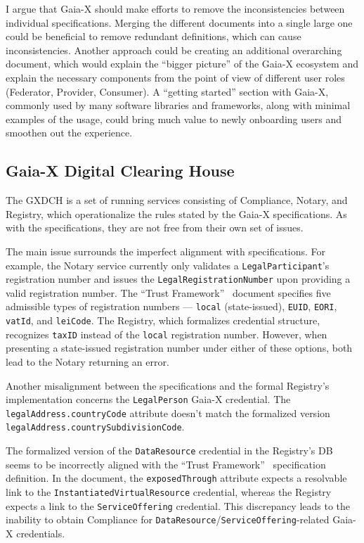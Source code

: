 I argue that Gaia-X should make efforts to remove the inconsistencies between individual specifications.
Merging the different documents into a single large one could be beneficial to remove redundant definitions, which can cause inconsistencies.
Another approach could be creating an additional overarching document, which would explain the ``bigger picture'' of the Gaia-X ecosystem and explain the necessary components from the point of view of different user roles (Federator, Provider, Consumer).
A ``getting started'' section with Gaia-X, commonly used by many software libraries and frameworks, along with minimal examples of the usage, could bring much value to newly onboarding users and smoothen out the experience.

\subsection{Gaia-X Digital Clearing House}\label{subsec:gaia-x-digital-clearing-house}

The GXDCH is a set of running services consisting of Compliance, Notary, and Registry, which operationalize the rules stated by the Gaia-X specifications.
As with the specifications, they are not free from their own set of issues.

The main issue surrounds the imperfect alignment with specifications.
For example, the Notary service currently only validates a \texttt{LegalParticipant}'s registration number and issues the \texttt{LegalRegistrationNumber} upon providing a valid registration number.
The ``Trust Framework''~\cite{gaiax_trust_framework} document specifies five admissible types of registration numbers --- \texttt{local} (state-issued), \texttt{EUID}, \texttt{EORI}, \texttt{vatId}, and \texttt{leiCode}.
The Registry, which formalizes credential structure, recognizes \texttt{taxID} instead of the \texttt{local} registration number.
However, when presenting a state-issued registration number under either of these options, both lead to the Notary returning an error.

Another misalignment between the specifications and the formal Registry's implementation concerns the \texttt{LegalPerson} Gaia-X credential.
The \texttt{legalAddress.countryCode} attribute doesn't match the formalized version \texttt{legalAddress.countrySubdivisionCode}.

The formalized version of the \texttt{DataResource} credential in the Registry's DB seems to be incorrectly aligned with the ``Trust Framework''~\cite{gaiax_trust_framework} specification definition.
In the document, the \texttt{exposedThrough} attribute expects a resolvable link to the \texttt{InstantiatedVirtualResource} credential, whereas the Registry expects a link to the \texttt{ServiceOffering} credential.
This discrepancy leads to the inability to obtain Compliance for \texttt{DataResource}/\texttt{ServiceOffering}-related Gaia-X credentials.

